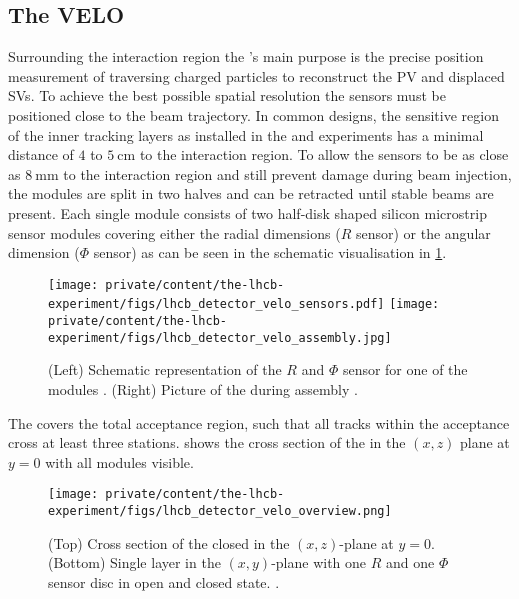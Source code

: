 \subsection{The \acl*{VELO}}
\label{sec:lhcb_experiment:tracking:velo}

Surrounding the \protonproton interaction region the \VELO's main purpose is the
precise position measurement of traversing charged particles to reconstruct the
\ac{PV} and displaced \acp{SV}. To achieve the best possible spatial resolution
the sensors must be positioned close to the beam trajectory. In common designs,
the sensitive region of the inner tracking layers as installed in the \ATLAS and
\CMS experiments has a minimal distance of $\num{4}$ to $\SI{5}{\centi\metre}$
to the interaction region. To allow the sensors to be as close as
$\SI{8}{\milli\metre}$ to the interaction region and still prevent damage during
beam injection, the \VELO modules are split in two halves and can be retracted
until stable beams are present. Each single module consists of two half-disk
shaped silicon microstrip sensor modules covering either the radial dimensions
($R$ sensor) or the angular dimension ($\mathit{\Phi}$ sensor) as can be seen in
the schematic visualisation in
\cref{fig:lhcb_experiment:tracking:velo:sensor}.
%
\begin{figure}[t]
  \texttt{[image: private/content/the-lhcb-experiment/figs/lhcb\_detector\_velo\_sensors.pdf]}
  \texttt{[image: private/content/the-lhcb-experiment/figs/lhcb\_detector\_velo\_assembly.jpg]}
  \caption{(Left) Schematic representation of the $R$ and $\mathit{\Phi}$ sensor
  for one of the \VELO modules \cite{Alves:2008zz}. (Right) Picture of the \VELO
  during assembly \cite{Aaij:1707015}. }
  \label{fig:lhcb_experiment:tracking:velo:sensor}
\end{figure}
%
The \VELO covers the total \LHCb acceptance region, such that all tracks within
the acceptance cross at least three \VELO stations.
 shows the cross section of the
\VELO in the $(x,z)$ plane at $y=0$ with all modules visible.
%
\begin{figure}[t]
  \texttt{[image: private/content/the-lhcb-experiment/figs/lhcb\_detector\_velo\_overview.png]}
  \caption{
    (Top) Cross section of the closed \VELO in the $(x,z)$-plane at $y=0$.
  (Bottom) Single \VELO layer in the $(x,y)$-plane with one $R$ and one
  $\mathit{\Phi}$ sensor disc in open and closed state. \cite{Alves:2008zz}.
  }
  \label{fig:lhcb_experiment:tracking:velo:overview}
\end{figure}

